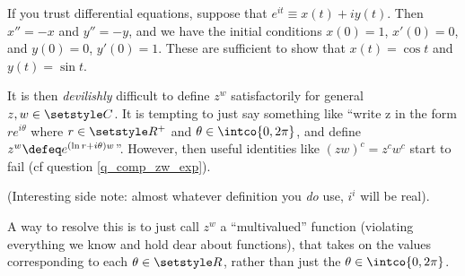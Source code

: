 If you trust differential equations, suppose that
\(e^{it} \equiv x(t) + i y(t)\). Then \(x'' = -x\) and \(y'' = -y\), and we have
the initial conditions \(x(0) = 1\), \(x'(0) = 0\), and \(y(0) = 0\),
\(y'(0) = 1\). These are sufficient to show that
\(x(t) = \cos t\) and \(y(t) = \sin t\).

It is then \emph{devilishly} difficult to define \(z^w\) satisfactorily for
general \(z, w \in \Complex\). It is tempting to just say something like ``write
z in the form \(re^{i\theta}\) where \(r \in \Reals^+\) and
\(\theta \in \intco{0, 2\pi}\), and define
\(z^w \defeq e^{(\ln r + i\theta)w}\)''.
However, then useful identities like \((zw)^c = z^c w^c\) start to fail (cf
question \ref{q_comp_zw_exp}).

(Interesting side note: almost whatever definition you \emph{do} use, \(i^i\)
will be real).

A way to resolve this is to just call \(z^w\) a ``multivalued'' function
(violating everything we know and hold dear about functions), that takes on
the values corresponding to each \(\theta \in \Reals\), rather than just the
\(\theta \in \intco{0, 2\pi}\).
